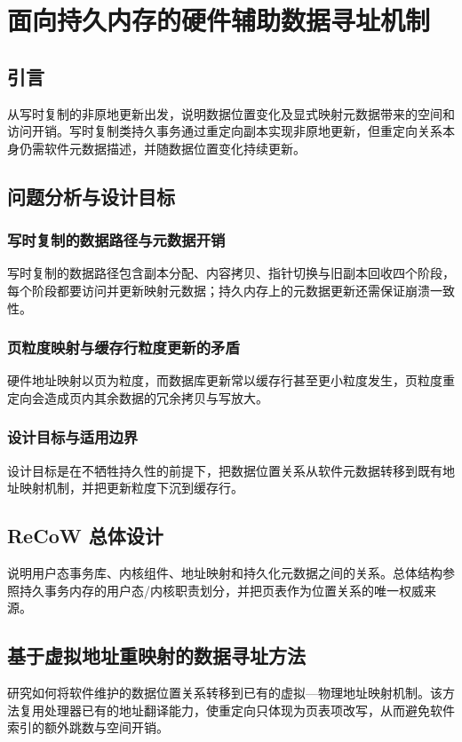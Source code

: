 \chapter{面向持久内存的硬件辅助数据寻址机制}

\section{引言}
从写时复制的非原地更新出发，说明数据位置变化及显式映射元数据带来的空间和访问开销。写时复制类持久事务通过重定向副本实现非原地更新\cite{liuDudetm2017,caiHoop2020}，但重定向关系本身仍需软件元数据描述，并随数据位置变化持续更新\cite{marmolLibpm2018,liCtfs2022}。
\section{问题分析与设计目标}
\subsection{写时复制的数据路径与元数据开销}
写时复制的数据路径包含副本分配、内容拷贝、指针切换与旧副本回收四个阶段，每个阶段都要访问并更新映射元数据\cite{liuDudetm2017}；持久内存上的元数据更新还需保证崩溃一致性\cite{correiaRomulus2018,assaTl4x2023}。
\subsection{页粒度映射与缓存行粒度更新的矛盾}
硬件地址映射以页为粒度\cite{liCtfs2022}，而数据库更新常以缓存行甚至更小粒度发生，页粒度重定向会造成页内其余数据的冗余拷贝与写放大\cite{niSsp2019,caiHoop2020}。
\subsection{设计目标与适用边界}
设计目标是在不牺牲持久性的前提下，把数据位置关系从软件元数据转移到既有地址映射机制，并把更新粒度下沉到缓存行\cite{liCtfs2022,niSsp2019}。
\section{ReCoW 总体设计}
说明用户态事务库、内核组件、地址映射和持久化元数据之间的关系。总体结构参照持久事务内存的用户态/内核职责划分\cite{gencCrafty2020,wuArchtm2021,castroSpht2021}，并把页表作为位置关系的唯一权威来源\cite{marmolLibpm2018,liCtfs2022}。
\section{基于虚拟地址重映射的数据寻址方法}
研究如何将软件维护的数据位置关系转移到已有的虚拟—物理地址映射机制。该方法复用处理器已有的地址翻译能力，使重定向只体现为页表项改写\cite{liCtfs2022,marmolLibpm2018}，从而避免软件索引的额外跳数与空间开销\cite{kadekodiWinefs2021,mathurNew2007}。
